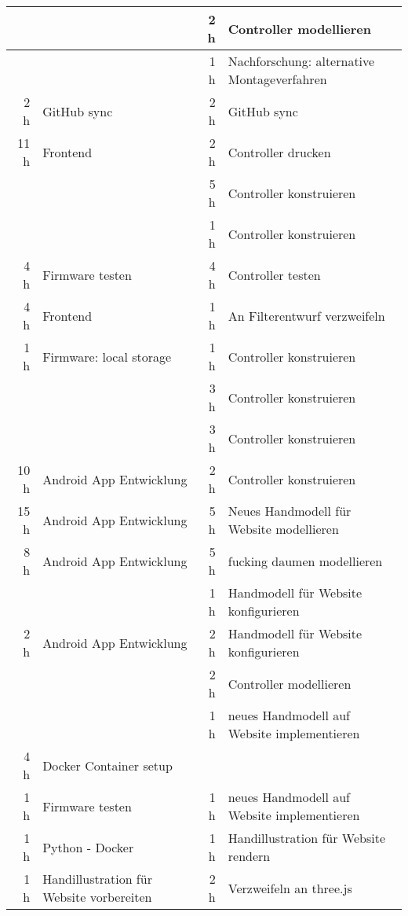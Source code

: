 \begin{table}[htbp]
\begin{tabular}{|r|l|r|l|}
    \hline
          &       & 2 h   & Controller modellieren \\
    \hline
          &       & 1 h   & Nachforschung: alternative Montageverfahren \\
    \hline
    2 h   & GitHub sync & 2 h   & GitHub sync \\
    \hline
    11 h  & Frontend & 2 h   & Controller drucken \\
    \hline
          &       & 5 h   & Controller konstruieren \\
    \hline
          &       & 1 h   & Controller konstruieren \\
    \hline
    4 h   & Firmware testen & 4 h   & Controller testen \\
    \hline
    4 h   & Frontend & 1 h   & An Filterentwurf verzweifeln \\
    \hline
    1 h   & Firmware: local storage & 1 h   & Controller konstruieren \\
    \hline
          &       & 3 h   & Controller konstruieren \\
    \hline
          &       & 3 h   & Controller konstruieren \\
    \hline
    10 h  & Android App Entwicklung & 2 h   & Controller konstruieren \\
    \hline
    15 h  & Android App Entwicklung & 5 h   & Neues Handmodell für Website modellieren \\
    \hline
    8 h   & Android App Entwicklung & 5 h   & fucking daumen modellieren \\
    \hline
          &       & 1 h   & Handmodell für Website konfigurieren \\
    \hline
    2 h   & Android App Entwicklung & 2 h   & Handmodell für Website konfigurieren \\
    \hline
          &       & 2 h   & Controller modellieren \\
    \hline
          &       & 1 h   & neues Handmodell auf Website implementieren \\
    \hline
    4 h   & Docker Container setup &       &  \\
    \hline
    1 h   & Firmware testen & 1 h   & neues Handmodell auf Website implementieren \\
    \hline
    1 h   & Python - Docker & 1 h   & Handillustration für Website rendern \\
    \hline
    1 h   & Handillustration für Website vorbereiten & 2 h   & Verzweifeln an three.js \\
    \hline

\end{tabular}
\end{table}
